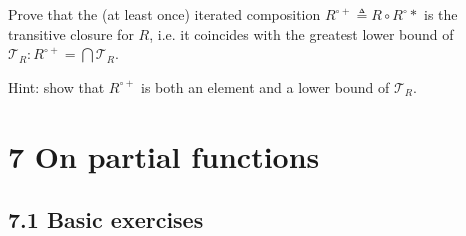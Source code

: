 \documentclass[10pt,\jkfside,a4paper]{article}
\begin{document}
\begin{enumerate}
\begin{enumerate}
Prove that the (at least once) iterated composition $R^{\circ +} \triangleq R \circ R^{\circ}*$ is the 
transitive closure for $R$, i.e. it coincides with the greatest lower bound of $\mathcal{T}_R: R^{\circ +} = \bigcap \mathcal{T}_R$.

Hint: show that $R^{\circ +}$ is both an element and a lower bound of $\mathcal{T}_R$.



\end{enumerate}

\end{enumerate}

\section*{7 On partial functions}

\subsection*{7.1 Basic exercises}
\end{document}
